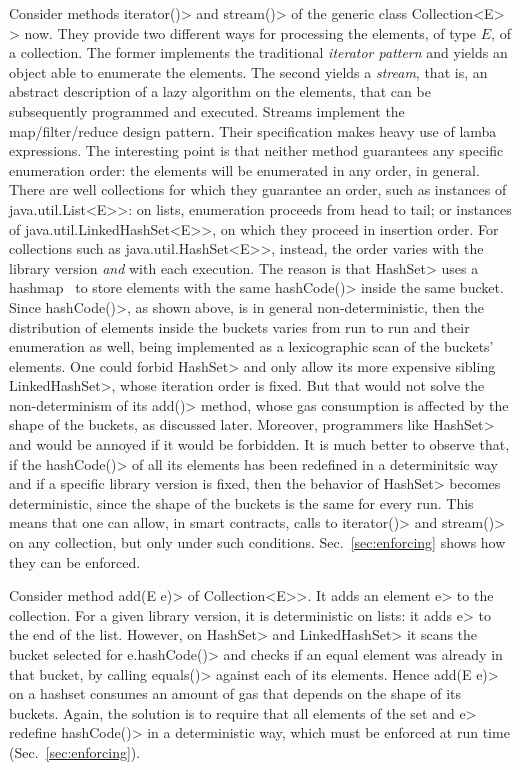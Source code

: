 Consider methods \<iterator()> and \<stream()> of the generic class
\<Collection$\text{<}$E$\text{>}$> now. They provide two different ways for
processing the elements, of type $E$, of a collection. The former implements
the traditional \emph{iterator pattern} and yields an object able to enumerate
the elements. The second yields a \emph{stream}, that is,
an abstract description of a lazy algorithm on the
elements, that can be subsequently programmed and executed.
Streams implement the map/filter/reduce design pattern. Their specification
makes heavy use of lamba expressions.
The interesting point is that neither method
guarantees any specific enumeration order: the elements will be
enumerated in any order, in general. There are well collections for which they
guarantee an order, such as instances of \<java.util.List$\text{<}$E$\text{>}$>:
on lists, enumeration proceeds from head to tail;
or instances of \<java.util.LinkedHashSet$\text{<}$E$\text{>}$>, on which they proceed in
insertion order.
For collections such as \<java.util.HashSet$\text{<}$E$\text{>}$>, instead, the order
varies with the library version \emph{and} with each execution. The reason is that
\<HashSet> uses a hashmap~\cite{CormenLRS09}
to store elements with the same \<hashCode()> inside the same bucket.
Since \<hashCode()>, as shown above, is in general non-deterministic, then
the distribution of elements inside the buckets varies from run to run and their enumeration
as well, being implemented as a lexicographic scan of the buckets' elements.
One could forbid \<HashSet> and only allow its
more expensive sibling \<LinkedHashSet>, whose iteration order is fixed.
But that would not solve the non-determinism of its \<add()> method, whose gas consumption
is affected by the shape of the buckets, as discussed later.
Moreover, programmers like \<HashSet> and would be annoyed if it would be
forbidden. It is much better to observe that, if the \<hashCode()> of all its elements has been
redefined in a determinitsic way
and if a specific library version is fixed, then the behavior of \<HashSet> becomes
deterministic, since the shape of the buckets is the same for every run. This means that one
can allow, in smart contracts, calls to \<iterator()> and \<stream()> on any collection,
but only under such conditions. Sec.~\ref{sec:enforcing} shows how they can be enforced.

Consider method \<add(E e)> of \<Collection$\text{<}$E$\text{>}$>.
It adds an element \<e> to the collection. For a given library version,
it is deterministic on lists: it adds \<e> to the end of the list.
However, on \<HashSet> and \<LinkedHashSet> it scans the bucket selected
for \<e.hashCode()> and checks if an equal element was already in that
bucket, by calling \<equals()> against each of its elements. Hence \<add(E e)>
on a hashset consumes an amount of gas that depends on the shape of its buckets.
Again, the solution is to require that all elements of the set and \<e> redefine
\<hashCode()> in a deterministic way, which must be enforced at run time
(Sec.~\ref{sec:enforcing}).

